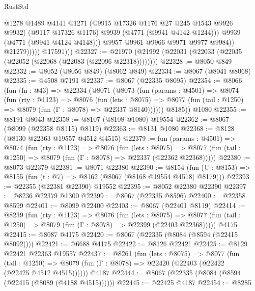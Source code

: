 \begin{lexlean}{RustStd}
\begin{coremodule}
                            @1278
                            @1489
                            @4141
                            @1271
                            (@9915 @17326 @1176 @27 @245 @1543 @9926 @9932)
                            (@9117 @17326 @1176)
                            @9939
                            (@4771 (@9941 @4142 @1244)))
                          @9939
                          (@4771 (@9941 @4124 @4148)))
                        @9957
                        @9961
                        @9966
                        @9971
                        @9977
                        @9984))
                    @21279)))))
          @17591)))
@22327 := @21970 (@21992 (@22031 (@22033 (@22035 (@22052 (@22068 (@22083 (@22096 @22318))))))))
@22328 := @8050 @849
@22332 := @8052 (@8056 @849) (@8062 @849)
@22334 := @8067 (@8041 @8068)
@22335 := @4508 @7191
@22337 := @8067 (@22335 @8095)
@22354 := @8066
    (fun (fn : @43) =>
    @22334
      (@8071
        (@8073
          (fun (params : @4501) =>
          @8074
            (fun (rty : @1123) =>
            @8076
              (fun (lets : @8075) =>
              @8077 (fun (tail : @1250) => @8079 (fun (Γ : @8078) => @22337 @8140))))))
        @8185))
    @1080
@22355 := @8191 @8043
@22358 := @8107 (@8108 @1080) @19554
@22362 := @8067 (@8099 (@22358 @8115) @8119)
@22363 := @8131 @1080
@22368 := @8128 (@8130 @22363 @19557 @4512 @4515)
@22379 := fun (params : @4501) =>
  @8074
    (fun (rty : @1123) =>
    @8076
      (fun (lets : @8075) =>
      @8077 (fun (tail : @1250) => @8079 (fun (Γ : @8078) => @22337 (@22362 @22368)))))
@22380 := @8073 @22379
@22381 := @8071 @22380
@22390 := @8154
    (fun (U : @8153) => @8155 (fun (t : @7) => @8162 (@8067 (@8168 @19554 @4518) @8179)))
@22393 := @22355 (@22381 @22390) @19552
@22395 := @8052 @22380 @22390
@22397 := @8236 @22379 @1300
@22399 := @8067 (@22335 @8596)
@22400 := @22358 @8599
@22401 := @8099 @22400
@22403 := @8067 (@22401 @8119)
@22414 := @8239
    (fun (rty : @1123) =>
    @8076
      (fun (lets : @8075) =>
      @8077 (fun (tail : @1250) => @8079 (fun (Γ : @8078) => @22399 (@22403 @22368)))))
    @4175
@22415 := @8087 @4175
@22420 := @8067 (@22335 (@8084 (@8594 (@22415 @8092))))
@22421 := @6688 @4175
@22422 := @8126 @22421
@22425 := @8129 @22421 @22363 @19557
@22437 := @8261
    (fun (lets : @8075) =>
    @8077
      (fun (tail : @1250) =>
      @8079 (fun (Γ : @8078) => @22420 (@22403 (@22422 (@22425 @4512 @4515))))))
    @4187
@22444 := @8067 (@22335 (@8084 (@8594 (@22415 (@8089 (@4188 @4515))))))
@22445 := @22425 @4187
@22454 := @8285

\end{coremodule}
\end{lexlean}
